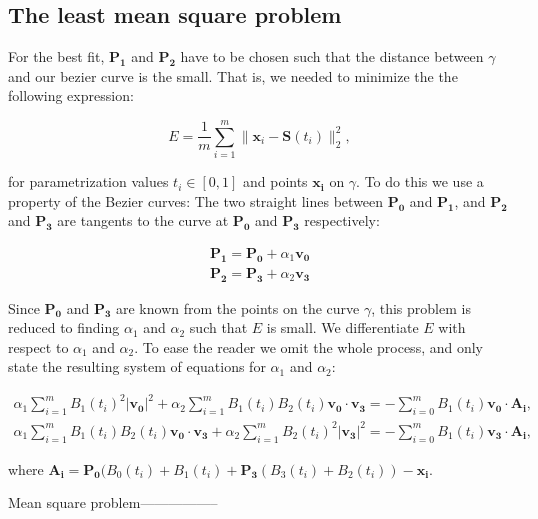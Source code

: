\documentclass[10pt]{article}
\begin{document}
\subsection*{The least mean square problem}

For the best fit, $\mathbf{P_1}$ and $\mathbf{P_2}$ have to be chosen such that the distance between $\gamma$ and our bezier curve is the small. That is, we needed to minimize the the following expression:

\begin{equation}
E = \frac{1}{m} \sum_{i=1}^{m} \| \mathbf{x}_i - \mathbf{S}(t_i)\|^2_2,
\end{equation}

for parametrization values $t_i \in [ 0,1 ]$ and points $\mathbf{x_i}$ on $\gamma$. To do this we use a property of the Bezier curves: The two straight lines between $\mathbf{P_0}$ and $\mathbf{P_1}$, and $\mathbf{P_2}$ and $\mathbf{P_3}$ are tangents to the curve at $\mathbf{P_0}$ and $\mathbf{P_3}$ respectively:

\begin{align}
\mathbf{P_1} = \mathbf{P_0} + \alpha_1 \mathbf{v_0} \\
\mathbf{P_2} = \mathbf{P_3} + \alpha_2 \mathbf{v_3}
\end{align}

Since $\mathbf{P_0}$ and $\mathbf{P_3}$ are known from the points on the curve $\gamma$, this problem is reduced to finding $\alpha_1$ and $\alpha_2$ such that $E$ is small. We differentiate $E$ with respect to $\alpha_1$ and $\alpha_2$. To ease the reader we omit the whole process, and only state the resulting system of equations for $\alpha_1$ and $\alpha_2$:


\begin{align}
\alpha_1 \sum_{i = 1}^m B_1(t_i)^2 |\mathbf{v_0}|^2 + \alpha_2 \sum_{i = 1}^m B_1(t_i)B_2(t_i)\mathbf{v_0} \cdot \mathbf{v_3} 
= - \sum_{i = 0}^m B_1(t_i) \mathbf{v_0} \cdot \mathbf{A_i}, \\
\alpha_1 \sum_{i = 1}^m B_1(t_i)B_2(t_i)\mathbf{v_0} \cdot \mathbf{v_3} + \alpha_2 \sum_{i = 1}^m B_2(t_i)^2 |\mathbf{v_3}|^2 
= - \sum_{i = 0}^m B_1(t_i)\mathbf{v_3} \cdot \mathbf{A_i},
\end{align}

where $\mathbf{A_i} = \mathbf{P_0}(B_0(t_i) + B_1(t_i) + \mathbf{P_3}(B_3(t_i) + B_2(t_i)) - \mathbf{x_i}$.




Mean square problem-----------------
\end{document}
